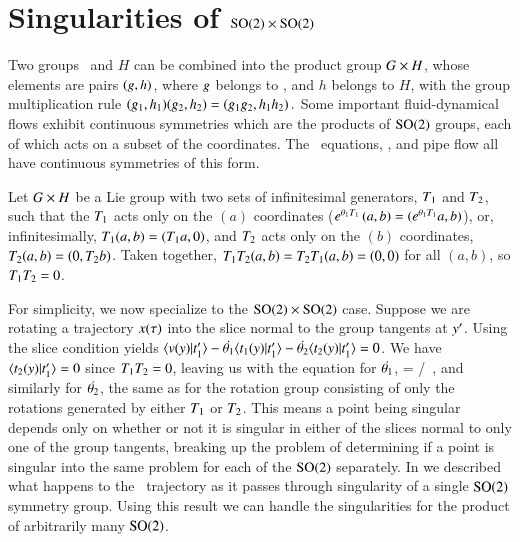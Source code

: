 \documentclass[preprint,12pt]{elsarticle} %
\begin{document}
\section{Singularities of $\textrm{SO}(2) \times \textrm{SO}(2)$}
	\label{sec:singulProd}

Two groups \Group\ and $H$ can be combined into the {product group}
$G \times H$, whose elements are pairs $(g,h)$, where $g$
belongs to \Group, and $h$ belongs to $H$, with the group multiplication
rule
\(
(g_1,h_1)(g_2,h_2)=(g_1 g_2,h_1 h_2)
\,.
\)
Some important fluid-dynamical flows exhibit continuous symmetries which
are the products of $\textrm{SO}(2)$ groups, each of which acts on a subset  of
the {\statesp} coordinates. The \KS\ equations,
{\pCf}, and pipe
flow all have continuous symmetries of this form.

Let $G \times H$ be a Lie group with two sets of infinitesimal
generators, $T_1$ and $T_2$, such that the $T_1$ acts only on the
$(a)$ coordinates ($e^{{\bf \theta}_1 T_1} \,
(a,b)=(e^{{\bf \theta}_1T_1}a,b)$), or, infinitesimally,
$T_1(a,b)=(T_1 a,0)$, and $T_2$ acts only on the $(b)$ coordinates,
$T_2(a,b)=(0,T_2 b)$. Taken together, $T_1 T_2(a,b) = T_2
T_1(a,b) = (0,0) $ for all $(a,b)$, so $T_1 T_2=0$.

For simplicity, we now specialize to the  $\textrm{SO}(2) \times \textrm{SO}(2)$ case.
Suppose we are rotating a trajectory $x(\tau)$ into the slice normal
to the group tangents at ${y'}$. Using the slice condition
 yields
$\braket{\vel(\sspRed)}{\sliceTan{1}}-\dot{\gSpace_1} \braket{
\groupTan_1(\sspRed)}{\sliceTan{1}}-\dot{\gSpace_2} \braket{
\groupTan_2(\sspRed)}{\sliceTan{1}}=0$. We have
$\braket{\groupTan_2(\sspRed)}{\sliceTan{1}}=0$ since $T_1 T_2=0$,
leaving us with the equation for $\dot{{\bf \theta}_1}$,
\beq
{}=     {} /
                     {}
\,,
\eeq
and similarly for $\dot{{\bf \theta}_2}$, the same as 
for the rotation group consisting of only the rotations generated by
either $T_1$ or $T_2$.  This means a point being singular depends
only on whether or not it is singular in either of the slices normal to
only one of the group tangents, breaking up the problem of determining if
a point is singular into the same problem for each of the $\textrm{SO}(2)$
separately. In  we described what happens to the
\reducedsp\ trajectory as it passes through singularity of a single
$\textrm{SO}(2)$ symmetry group. Using this result we can handle the
singularities for the product of arbitrarily many $\textrm{SO}(2)$.




\ifboyscout
\newpage
    
\fi
\end{document}
